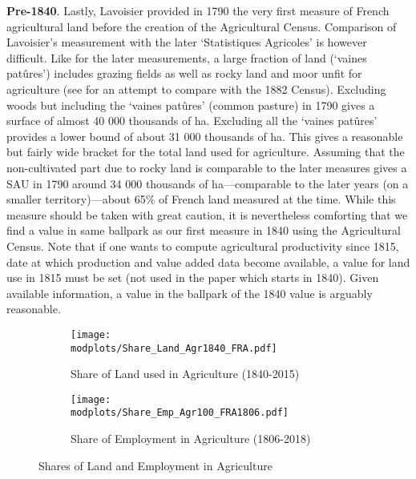\documentclass[11pt]{report}
\newcommand{\round}{revision3}  %
\newcommand{\modplots}{../../output/model/plots/\round}
\begin{document}
\noindent \textbf{Pre-1840}. Lastly, Lavoisier provided in 1790 the very first measure of French agricultural land before the creation of the Agricultural Census. Comparison of Lavoisier's measurement with the later `Statistiques Agricoles' is however difficult. Like for the later measurements, a large fraction of land (`vaines patûres') includes grazing fields as well as rocky land and moor unfit for agriculture (see \cite{mauguin1890statistique} for an attempt to compare with the 1882 Census). Excluding woods but including the `vaines patûres' (common pasture) in 1790 gives a surface of almost 40 000 thousands of ha. Excluding all the `vaines patûres' provides a lower bound of about 31 000 thousands of ha. This gives a reasonable but fairly wide bracket for the total land used for agriculture. Assuming that the non-cultivated part due to rocky land is comparable to the later measures gives a SAU in 1790 around 34 000 thousands of ha---comparable to the later years (on a smaller territory)---about 65\% of French land measured at the time. While this measure should be taken with great caution, it is nevertheless comforting that we find a value in same ballpark as our first measure in 1840 using the Agricultural Census. Note that if one wants to compute agricultural productivity since 1815, date at which production and value added data become available, a value for land use in 1815 must be set (not used in the paper which starts in 1840). Given available information, a value in the ballpark of the 1840 value is arguably reasonable.



\begin{figure}	
	\hspace{-15mm}
	\begin{subfigure}{0.55\textwidth}
			\texttt{[image: \\modplots/Share\_Land\_Agr1840\_FRA.pdf]}
		\vspace{-0.65cm}
		\caption{Share of Land used in Agriculture (1840-2015)\label{A-fig:shares_land_long}}
	\end{subfigure}%
	\hspace{5mm}
	\begin{subfigure}{0.55\textwidth}
			\texttt{[image: \\modplots/Share\_Emp\_Agr100\_FRA1806.pdf]}
		\vspace{-0.65cm}
		\caption{Share of Employment in Agriculture (1806-2018)}\label{A-fig:shares_emp_long}
	\end{subfigure}%
	\vspace{-0.1cm}
	\caption{Shares of Land and Employment in Agriculture}
\end{figure}
\end{document}
